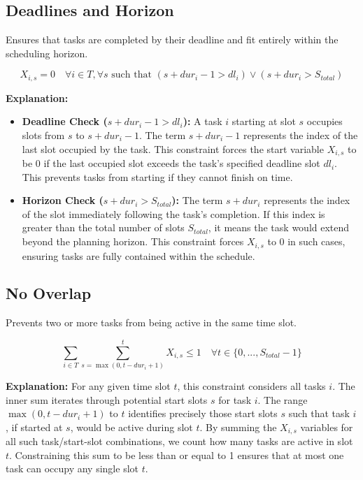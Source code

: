 \documentclass{article}
\begin{document}
\subsection{Deadlines and Horizon}
Ensures that tasks are completed by their deadline and fit entirely within the scheduling horizon.

\[
X_{i,s} = 0 \quad \forall i \in T, \forall s \text{ such that } (s + dur_i - 1 > dl_i) \lor (s + dur_i > S_{total})
\]

\textbf{Explanation:}
\begin{itemize}
    \item \textbf{Deadline Check ($s + dur_i - 1 > dl_i$):} A task $i$ starting at slot $s$ occupies slots from $s$ to $s + dur_i - 1$. The term $s + dur_i - 1$ represents the index of the last slot occupied by the task. This constraint forces the start variable $X_{i,s}$ to be 0 if the last occupied slot exceeds the task's specified deadline slot $dl_i$. This prevents tasks from starting if they cannot finish on time.
    \item \textbf{Horizon Check ($s + dur_i > S_{total}$):} The term $s + dur_i$ represents the index of the slot immediately following the task's completion. If this index is greater than the total number of slots $S_{total}$, it means the task would extend beyond the planning horizon. This constraint forces $X_{i,s}$ to 0 in such cases, ensuring tasks are fully contained within the schedule.
\end{itemize}

\subsection{No Overlap}
Prevents two or more tasks from being active in the same time slot.

\[
\sum_{i \in T} \sum_{s = \max(0, t - dur_i + 1)}^{t} X_{i,s} \le 1 \quad \forall t \in \{0, ..., S_{total}-1\}
\]

\textbf{Explanation:} For any given time slot $t$, this constraint considers all tasks $i$. The inner sum iterates through potential start slots $s$ for task $i$. The range $\max(0, t - dur_i + 1)$ to $t$ identifies precisely those start slots $s$ such that task $i$, if started at $s$, would be active during slot $t$. By summing the $X_{i,s}$ variables for all such task/start-slot combinations, we count how many tasks are active in slot $t$. Constraining this sum to be less than or equal to 1 ensures that at most one task can occupy any single slot $t$.
\end{document}
